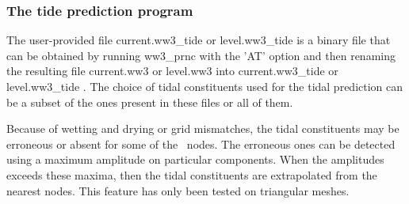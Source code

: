 \vsssub
\subsubsection{The tide prediction program} \label{sub:ww3prtide}
\vsssub



\vspace{\baselineskip} 
\vspace{\baselineskip} 
\noindent 
The user-provided file current.ww3\_tide or level.ww3\_tide is a binary file
that can be obtained by running ww3\_prnc with the 'AT' option and then
renaming the resulting file current.ww3 or level.ww3 into current.ww3\_tide or
level.ww3\_tide . The choice of tidal constituents used for the tidal
prediction can be a subset of the ones present in these files or all of them.

Because of wetting and drying or grid mismatches, the tidal constituents may
be erroneous or absent for some of the \ws\ nodes. The erroneous ones can be
detected using a maximum amplitude on particular components. When the
amplitudes exceeds these maxima, then the tidal constituents are extrapolated
from the nearest nodes. This feature has only been tested on triangular
meshes.

\pb
